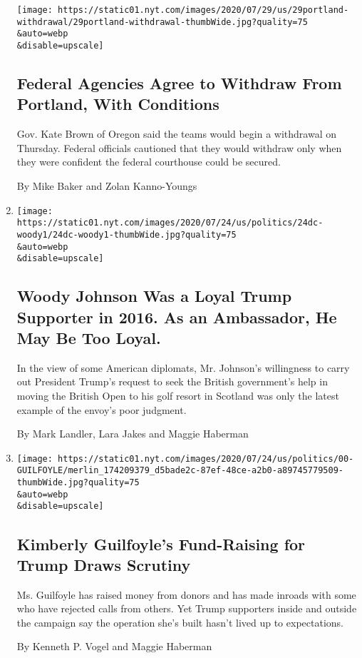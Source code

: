 \begin{enumerate}
  \texttt{[image: https://static01.nyt.com/images/2020/07/29/us/29portland-withdrawal/29portland-withdrawal-thumbWide.jpg?quality=75\\\&auto=webp\\\&disable=upscale]}

  \hypertarget{federal-agencies-agree-to-withdraw-from-portland-with-conditions}{%
  \subsection{Federal Agencies Agree to Withdraw From Portland, With
  Conditions}\label{federal-agencies-agree-to-withdraw-from-portland-with-conditions}}

  Gov. Kate Brown of Oregon said the teams would begin a withdrawal on
  Thursday. Federal officials cautioned that they would withdraw only
  when they were confident the federal courthouse could be secured.

  By Mike Baker and Zolan Kanno-Youngs
\item
  \href{/2020/07/24/world/europe/woody-johnson-trump.html}{}

  \texttt{[image: https://static01.nyt.com/images/2020/07/24/us/politics/24dc-woody1/24dc-woody1-thumbWide.jpg?quality=75\\\&auto=webp\\\&disable=upscale]}

  \hypertarget{woody-johnson-was-a-loyal-trump-supporter-in-2016-as-an-ambassador-he-may-be-too-loyal}{%
  \subsection{Woody Johnson Was a Loyal Trump Supporter in 2016. As an
  Ambassador, He May Be Too
  Loyal.}\label{woody-johnson-was-a-loyal-trump-supporter-in-2016-as-an-ambassador-he-may-be-too-loyal}}

  In the view of some American diplomats, Mr. Johnson's willingness to
  carry out President Trump's request to seek the British government's
  help in moving the British Open to his golf resort in Scotland was
  only the latest example of the envoy's poor judgment.

  By Mark Landler, Lara Jakes and Maggie Haberman
\item
  \href{/2020/07/24/us/politics/kimberly-guilfoyles-trump-fundraising.html}{}

  \texttt{[image: https://static01.nyt.com/images/2020/07/24/us/politics/00-GUILFOYLE/merlin\_174209379\_d5bade2c-87ef-48ce-a2b0-a89745779509-thumbWide.jpg?quality=75\\\&auto=webp\\\&disable=upscale]}

  \hypertarget{kimberly-guilfoyles-fund-raising-for-trump-draws-scrutiny}{%
  \subsection{Kimberly Guilfoyle's Fund-Raising for Trump Draws
  Scrutiny}\label{kimberly-guilfoyles-fund-raising-for-trump-draws-scrutiny}}

  Ms. Guilfoyle has raised money from donors and has made inroads with
  some who have rejected calls from others. Yet Trump supporters inside
  and outside the campaign say the operation she's built hasn't lived up
  to expectations.

  By Kenneth P. Vogel and Maggie Haberman
\end{enumerate}

